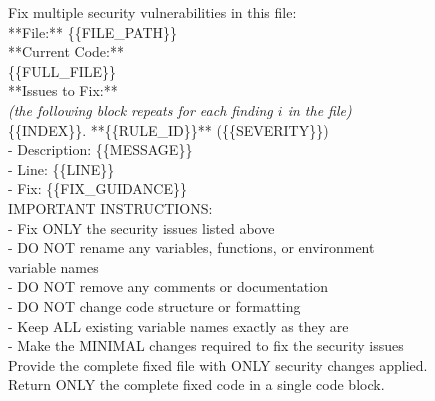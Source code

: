 \begin{tcolorbox}[
    colback=gray!5!white,
    colframe=gray!75!black,
    title=User message template B --- batch (one call per file),
    fonttitle=\bfseries,
    breakable
]
\small\ttfamily
Fix multiple security vulnerabilities in this file:\\[6pt]
**File:** \{\{FILE\_PATH\}\}\\[6pt]
**Current Code:**\\
\{\{FULL\_FILE\}\}\\[6pt]
**Issues to Fix:**\\[6pt]
\textrm{\itshape(the following block repeats for each finding $i$ in the file)}\\
\{\{INDEX\}\}. **\{\{RULE\_ID\}\}** (\{\{SEVERITY\}\})\\
\hspace*{1em}- Description: \{\{MESSAGE\}\}\\
\hspace*{1em}- Line: \{\{LINE\}\}\\
\hspace*{1em}- Fix: \{\{FIX\_GUIDANCE\}\}\\[6pt]
IMPORTANT INSTRUCTIONS:\\
\hspace*{1em}- Fix ONLY the security issues listed above\\
\hspace*{1em}- DO NOT rename any variables, functions, or environment\\
\hspace*{2em}variable names\\
\hspace*{1em}- DO NOT remove any comments or documentation\\
\hspace*{1em}- DO NOT change code structure or formatting\\
\hspace*{1em}- Keep ALL existing variable names exactly as they are\\
\hspace*{1em}- Make the MINIMAL changes required to fix the security issues\\[6pt]
Provide the complete fixed file with ONLY security changes applied.\\
Return ONLY the complete fixed code in a single code block.
\end{tcolorbox}

